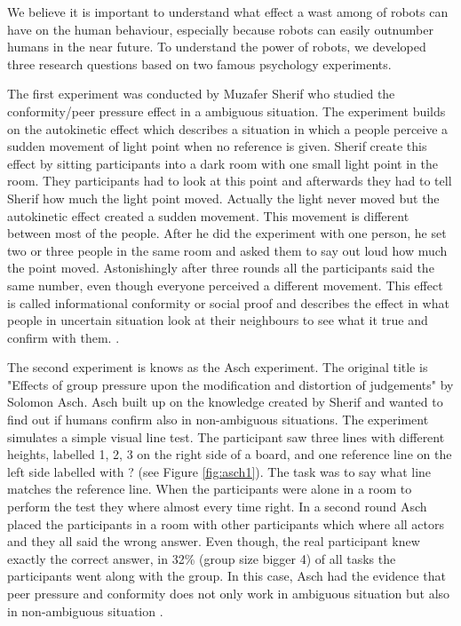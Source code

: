 \documentclass{acm_proc_article-sp}
\begin{document}
We believe it is important to understand what effect a wast among of robots can have on the human behaviour, especially because robots can easily outnumber humans in the near future. To understand the power of robots, we developed three research questions based on two famous psychology experiments. 

The first experiment was conducted by Muzafer Sherif who studied the conformity/peer pressure effect in a ambiguous situation. The experiment builds on the autokinetic effect which describes a situation in which a people perceive a sudden movement of light point when no reference is given. Sherif create this effect by sitting participants into a dark room with one small light point in the room. They participants had to look at this point and afterwards they had to tell Sherif how much the light point moved. Actually the light never moved but the autokinetic effect created a sudden movement. This movement is different between most of the people. After he did the experiment with one person, he set two or three people in the same room and asked them to say out loud how much the point moved.  Astonishingly after three rounds all the participants said the same number, even though everyone perceived a different movement. This effect is called informational conformity or social proof and describes the effect in what people in uncertain situation look at their neighbours to see what it true and confirm with them. \cite{Cialdini2009} \cite{sherif1935study}\cite{McLeod2007}.


The second experiment is knows as the Asch experiment. The original title is "Effects of group pressure upon the modification and distortion of judgements" by Solomon Asch. Asch built up on the knowledge created by Sherif and wanted to find out if humans confirm also in non-ambiguous situations. The experiment simulates a simple visual line test. The participant saw three lines with different heights, labelled 1, 2, 3 on the right side of a board, and one reference line on the left side labelled with ? (see Figure \ref{fig:asch1}). The task was to say what line matches the reference line. When the participants were alone in a room to perform the test they where almost every time right. In a second round Asch placed the participants in a room with other participants which where all actors and they all said the wrong answer. Even though, the real participant knew exactly the correct answer, in 32\% (group size bigger 4) of all tasks the participants went along with the group. In this case, Asch had the evidence that peer pressure and conformity does not only work in ambiguous situation but also in non-ambiguous situation \cite{McLeod}\cite{asch1955opinions}\cite{asch1951effects}\cite{2011-16966-00119560101}. 
\end{document}
